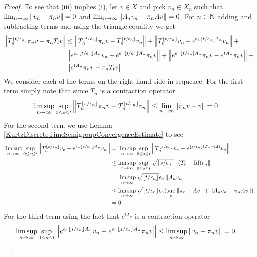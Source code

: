 \begin{proof}
To see that (iii) implies (i), let $v \in X$ and pick $v_n \in X_n$ such that $\lim_{n \to \infty} \left \lVert v_n - \pi_n v \right \rVert = 0$ and $\lim_{n \to \infty} \left \lVert A_n v_n - \pi_n A v \right \rVert = 0$.  For
$n \in \mathbb{N}$ adding and subtracting terms and using the triangle equality we get
\begin{align*}
\left \lVert T^{\left \lfloor t/\epsilon_n \right \rfloor}_n \pi_n v - \pi_n T_t v \right \rVert 
&\leq \left \lVert T^{\left \lfloor t/\epsilon_n \right \rfloor}_n \pi_n v - T^{\left \lfloor t/\epsilon_n \right \rfloor}_n v_n \right \rVert  + 
\left \lVert T^{\left \lfloor t/\epsilon_n \right \rfloor}_n v_n - e^{\epsilon_n \left \lfloor t/\epsilon_n \right \rfloor A_n} v_n \right \rVert + \\
&\left \lVert e^{\epsilon_n \left \lfloor t/\epsilon_n \right \rfloor A_n} v_n - e^{\epsilon_n \left \lfloor t/\epsilon_n \right \rfloor A_n} \pi_n v \right \rVert + 
\left \lVert e^{\epsilon_n \left \lfloor t/\epsilon_n \right \rfloor A_n} \pi_n v - e^{t A_n} \pi_n v \right \rVert + \\
&\left \lVert e^{t A_n} \pi_n v - \pi_n T_t v \right \rVert
\end{align*}
We consider each of the terms on the right hand side in sequence.  For the first term simply note that since $T_n$ is a contraction operator
\begin{align*}
\limsup_{n \to \infty} \sup_{0 \leq s \leq t} \left \lVert T^{\left \lfloor s/\epsilon_n \right \rfloor}_n \pi_n v - T^{\left \lfloor t/\epsilon_n \right \rfloor}_n v_n \right \rVert &\leq \lim_{n \to \infty} \left \lVert \pi_n v - v \right \rVert = 0
\end{align*}
For the second term we use Lemma \ref{KurtzDiscreteTimeSemigroupConvergenceEstimate} to see 
\begin{align*}
\limsup_{n \to \infty} \sup_{0 \leq s \leq t} \left \lVert T^{\left \lfloor s/\epsilon_n \right \rfloor}_n v_n - e^{\epsilon_n \left \lfloor s/\epsilon_n \right \rfloor A_n} v_n \right \rVert 
&=\limsup_{n \to \infty} \sup_{0 \leq s \leq t} \left \lVert T^{\left \lfloor s/\epsilon_n \right \rfloor}_n v_n - e^{\left \lfloor s/\epsilon_n \right \rfloor (T_n- \operatorname*{Id})} v_n \right \rVert  \\
&\leq \limsup_{n \to \infty} \sup_{0 \leq s \leq t} \sqrt{\left \lfloor s/\epsilon_n \right \rfloor} \left \lVert (T_n- \operatorname*{Id}) v_n \right \rVert \\
&= \limsup_{n \to \infty} \sqrt{\left \lfloor t/\epsilon_n \right \rfloor} \epsilon_n \left \lVert A_n v_n \right \rVert \\
&\leq \limsup_{n \to \infty} \sqrt{\left \lfloor t/\epsilon_n \right \rfloor} \epsilon_n (\sup_n \left \lVert \pi_n \right \rVert \left \lVert A v \right \rVert  + \left \lVert A_n v_n - \pi_n A v \right \rVert) \\
&= 0
\end{align*}
For the third term using the fact that $e^{tA_n}$ is a contraction operator 
\begin{align*}
\limsup_{n \to \infty} \sup_{0 \leq s \leq t}\norm{e^{\epsilon_n \floor{s/\epsilon_n} A_n} v_n - e^{\epsilon_n \floor{s/\epsilon_n} A_n} \pi_n v}
&\leq \limsup_{n \to \infty} \norm{v_n -\pi_n v} =0

\end{align*}
\end{proof}
